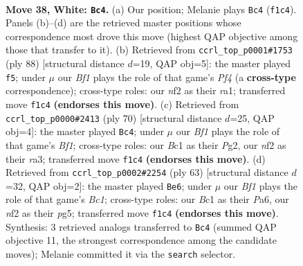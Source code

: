 \documentclass[11pt]{article}
\begin{document}
\clearpage

\begin{figure}[p]\centering
\begin{subfigure}{0.46\textwidth}\centering
\resizebox{\linewidth}{!}{%
\newchessgame
\chessboard[
  setfen={4r3/pb1p1pk1/8/6P1/8/8/PPK2n2/2B2BR1 w - - 0 38},
  showmover=false,
  pgfstyle=straightmove, color=movearrow, markmove={f1-c4}
]}
\caption{}
\end{subfigure}\hfill
\begin{subfigure}{0.46\textwidth}\centering
\resizebox{\linewidth}{!}{%
\newchessgame
\chessboard[
  setfen={8/2b2k1p/4p2P/3p4/5PP1/2P5/2KB1R2/r7 w - - 0 45},
  showmover=false,
  pgfstyle=straightmove, color=movearrow, markmove={f4-f5}
]}
\caption{}
\end{subfigure}
\\[4pt]
\begin{subfigure}{0.46\textwidth}\centering
\resizebox{\linewidth}{!}{%
\newchessgame
\chessboard[
  setfen={7k/3b3p/3p2p1/8/4P3/rP6/6PP/4RB1K w - - 4 36},
  showmover=false,
  pgfstyle=straightmove, color=movearrow, markmove={f1-c4}
]}
\caption{}
\end{subfigure}\hfill
\begin{subfigure}{0.46\textwidth}\centering
\resizebox{\linewidth}{!}{%
\newchessgame
\chessboard[
  setfen={r1b5/6k1/p5p1/6P1/2pR4/B7/P4PP1/6K1 b - - 0 32},
  showmover=false,
  pgfstyle=straightmove, color=movearrow, markmove={c8-e6}
]}
\caption{}
\end{subfigure}
\caption{\textbf{Move 38, White: \texttt{Bc4}.} (a) Our position; Melanie plays \texttt{Bc4} (\texttt{f1c4}). Panels (b)--(d) are the retrieved master positions whose correspondence most drove this move (highest QAP objective among those that transfer to it). (b) Retrieved from \texttt{ccrl\_top\_p0001\#1753} (ply 88) [structural distance $d$=19, QAP obj=5]: the master played \texttt{f5}; under $\mu$ our \emph{Bf1} plays the role of that game's \emph{Pf4} (a \textbf{cross-type} correspondence); cross-type roles: our \emph{n}f2 as their \emph{r}a1; transferred move \texttt{f1c4} \textbf{(endorses this move)}. (c) Retrieved from \texttt{ccrl\_top\_p0000\#2413} (ply 70) [structural distance $d$=25, QAP obj=4]: the master played \texttt{Bc4}; under $\mu$ our \emph{Bf1} plays the role of that game's \emph{Bf1}; cross-type roles: our \emph{B}c1 as their \emph{P}g2, our \emph{n}f2 as their \emph{r}a3; transferred move \texttt{f1c4} \textbf{(endorses this move)}. (d) Retrieved from \texttt{ccrl\_top\_p0002\#2254} (ply 63) [structural distance $d$=32, QAP obj=2]: the master played \texttt{Be6}; under $\mu$ our \emph{Bf1} plays the role of that game's \emph{Bc1}; cross-type roles: our \emph{B}c1 as their \emph{P}a6, our \emph{n}f2 as their \emph{p}g5; transferred move \texttt{f1c4} \textbf{(endorses this move)}. Synthesis: 3 retrieved analogs transferred to \texttt{Bc4} (summed QAP objective 11, the strongest correspondence among the candidate moves); Melanie committed it via the \texttt{search} selector.}
\label{fig:thought-m74}
\end{figure}
\end{document}
